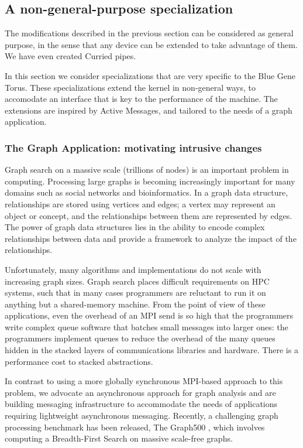 \documentclass[letterpaper,twocolumn,10pt]{article}
\begin{document}
\subsection{A non-general-purpose specialization}
The modifications described in the previous section can be considered as general purpose, in the sense 
that any device can be extended to take advantage of them. We have even created Curried pipes. 

In this section we consider specializations that are very specific to the Blue Gene Torus. These specializations extend the kernel in non-general ways, to accomodate an interface that is key to the performance of the machine. The extensions are inspired by Active Messages\cite{von1992active},  and tailored to the needs of a graph application. 

\subsubsection{The Graph Application: motivating intrusive changes}

Graph search on a massive scale (trillions of nodes)
is an important problem in computing. 
Processing   large  graphs   is  becoming   increasingly  important
for  many domains such as social networks and bioinformatics. 
In a graph data structure,
relationships are stored using vertices and edges; a vertex
may represent an object or concept, and the relationships between them
are represented by edges.  The power of graph data structures lies in
the ability to encode complex relationships between data and provide a
framework to analyze the impact of the relationships.

Unfortunately, many algorithms and implementations do not
scale with increasing  graph sizes.  Graph search  places difficult requirements on HPC systems, such that in many cases
programmers are reluctant to run it on anything but a shared-memory machine. 
From the point of view of these applications, even the overhead of an MPI send is so high that the programmers write complex 
queue software that batches small messages into larger ones: the programmers implement queues to reduce the overhead of the many
queues hidden in the stacked layers  of communications libraries and hardware. There is a performance cost to stacked abstractions. 

In contrast to using a  more globally synchronous MPI-based
approach to this problem, we advocate an asynchronous approach for graph analysis\cite{Pearce2010}
and are building messaging infrastructure to accommodate the needs
of applications requiring lightweight asynchronous messaging.
Recently, a challenging graph processing benchmark has been released,
The Graph500 \cite{Graph500}, which involves computing a Breadth-First
Search on massive scale-free graphs.
\end{document}
